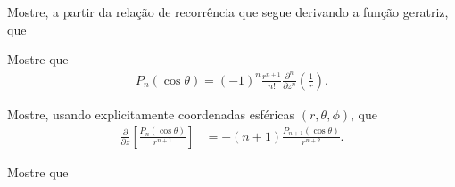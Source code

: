 \documentclass[a4paper,12pt, leqno, answers]{exam}
\begin{document}
\thispagestyle{empty}

\newpage
\setcounter{page}{1}
\begin{questions}
    \question Mostre, a partir da rela\c{c}\~{a}o de recorr\^{e}ncia que segue derivando a fun\c{c}\~{a}o geratriz, que

    \question Mostre que
    \begin{align*}
        P_n(\cos \theta) = (-1)^n \frac{r^{n + 1}}{n!} \frac{\partial^n}{\partial z^n} \left( \frac{1}{r} \right).
    \end{align*}
    \begin{solution}
        
    \end{solution}

    \question Mostre, usando explicitamente coordenadas esf\'{e}ricas $(r, \theta, \phi)$, que
    \begin{align*}
        \frac{\partial}{\partial z} \left[ \frac{P_n(\cos \theta)}{r^{n + 1}} \right] &= - (n + 1) \frac{P_{n + 1}(\cos \theta)}{r^{n + 2}}.
    \end{align*}
    \begin{solution}
        
    \end{solution}

    \question Mostre que
\end{questions}
\end{document}
